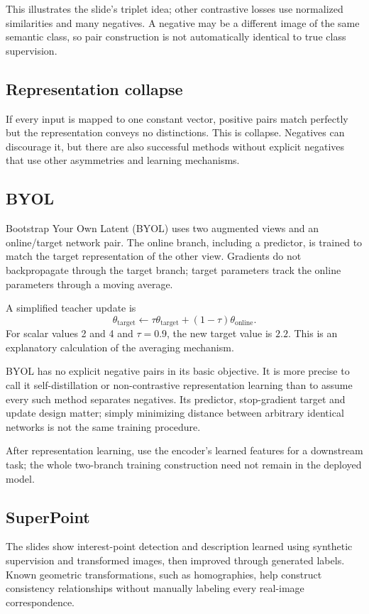 \documentclass[11pt]{article}
\begin{document}
This illustrates the slide's triplet idea; other contrastive losses use normalized similarities and many negatives. A negative may be a different image of the same semantic class, so pair construction is not automatically identical to true class supervision.

\subsection{Representation collapse}
If every input is mapped to one constant vector, positive pairs match perfectly but the representation conveys no distinctions. This is collapse. Negatives can discourage it, but there are also successful methods without explicit negatives that use other asymmetries and learning mechanisms.

\subsection{BYOL}
Bootstrap Your Own Latent (BYOL) uses two augmented views and an online/target network pair. The online branch, including a predictor, is trained to match the target representation of the other view. Gradients do not backpropagate through the target branch; target parameters track the online parameters through a moving average.

A simplified teacher update is
\[
\theta_{\mathrm{target}}\leftarrow
\tau\theta_{\mathrm{target}}+(1-\tau)\theta_{\mathrm{online}}.
\]
For scalar values 2 and 4 and $\tau=0.9$, the new target value is $2.2$. This is an explanatory calculation of the averaging mechanism.

BYOL has no explicit negative pairs in its basic objective. It is more precise to call it self-distillation or non-contrastive representation learning than to assume every such method separates negatives. Its predictor, stop-gradient target and update design matter; simply minimizing distance between arbitrary identical networks is not the same training procedure.

After representation learning, use the encoder's learned features for a downstream task; the whole two-branch training construction need not remain in the deployed model.

\subsection{SuperPoint}
The slides show interest-point detection and description learned using synthetic supervision and transformed images, then improved through generated labels. Known geometric transformations, such as homographies, help construct consistency relationships without manually labeling every real-image correspondence.
\end{document}
